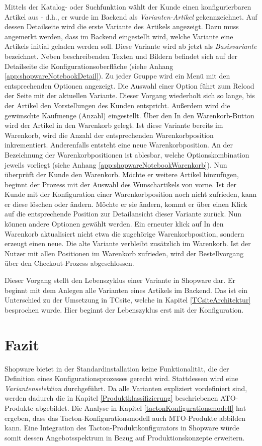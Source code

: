 \documentclass[11pt, a4paper, titlepage, listof=totoc, bibliography=totoc, index=totoc, twoside, openright, headings=normal, draft]{scrreprt}
\begin{document}
Mittels der Katalog- oder Suchfunktion wählt der Kunde einen konfigurierbaren Artikel aus - d.h., er wurde im Backend als \emph{Varianten-Artikel} gekennzeichnet. Auf dessen Detailseite wird die erste Variante des Artikels angezeigt. Dazu muss angemerkt werden, dass im Backend eingestellt wird, welche Variante eine Artikels initial geladen werden soll. Diese Variante wird ab jetzt als \emph{Basisvariante} bezeichnet. Neben beschreibenden Texten und Bildern befindet sich auf der Detailseite die Konfigurationsoberfläche (siehe Anhang \ref{app:shopwareNotebookDetail}). Zu jeder Gruppe wird ein Menü mit den entsprechenden Optionen angezeigt. Die Auswahl einer Option führt zum Reload der Seite mit der aktuellen Variante. Dieser Vorgang wiederholt sich so lange, bis der Artikel den Vorstellungen des Kunden entspricht. Außerdem wird die gewünschte Kaufmenge (Anzahl) eingestellt. Über den \glqq In den Warenkorb\grqq{}-Button wird der Artikel in den Warenkorb gelegt. Ist diese Variante bereits im Warenkorb, wird die Anzahl der entsprechenden Warenkorbposition inkrementiert. Anderenfalls entsteht eine neue Warenkorbposition. An der Bezeichnung der Warenkorbpositionen ist ablesbar, welche Optionskombination jeweils vorliegt (siehe Anhang \ref{app:shopwareNotebookWarenkorb}). Nun überprüft der Kunde den Warenkorb. Möchte er weitere Artikel hinzufügen, beginnt der Prozess mit der Auswahl des Wunschartikels von vorne. Ist der Kunde mit der Konfiguration einer Warenkorbposition noch nicht zufrieden, kann er diese löschen oder ändern. Möchte er sie ändern, kommt er über einen Klick auf die entsprechende Position zur Detailansicht dieser Variante zurück. Nun können andere Optionen gewählt werden. Ein erneuter klick auf \glqq In den Warenkorb\grqq{} aktualisiert nicht etwa die zugehörige Warenkorbposition, sondern erzeugt einen neue. Die alte Variante verbleibt zusätzlich im Warenkorb. Ist der Nutzer mit allen Positionen im Warenkorb zufrieden, wird der Bestellvorgang über den Checkout-Prozess abgeschlossen.

Dieser Vorgang stellt den Lebenszyklus einer Variante in Shopware dar. Er beginnt mit dem Anlegen alle Varianten eines Artikels im Backend. Das ist ein Unterschied zu der Umsetzung in TCsite, welche in Kapitel \ref{TCsiteArchitektur}
 besprochen wurde. Hier beginnt der Lebenszyklus erst mit der Konfiguration.

\section{Fazit}
\label{analyseFazit}
Shopware bietet in der Standardinstallation keine Funktionalität, die der Definition eines Konfigurationsprozesses gerecht wird. Stattdessen wird eine \emph{Variantenselektion} durchgeführt. Da alle Varianten expliziert vordefiniert sind, werden dadurch die in Kapitel \ref{Produktklassifizierung} beschriebenen \ac{ATO}-Produkte abgebildet. Die Analyse in Kapitel \ref{tactonKonfigurationsmodell} hat ergeben, dass das Tacton-Konfigurationsmodell auch \ac{MTO}-Produkte abbilden kann. Eine Integration des Tacton-Produktkonfigurators in Shopware würde somit dessen Angebotsspektrum in Bezug auf Produktionskonzepte erweitern.
\end{document}
